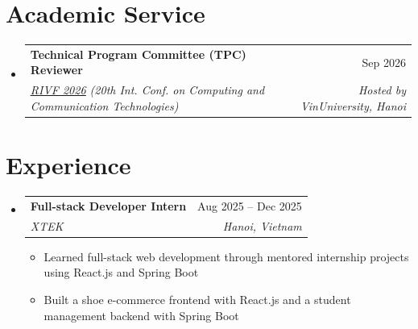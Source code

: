 \documentclass[letterpaper,11pt]{article}
\makeatletter
\newcommand{\resumeItem}[1]{\item\small{{#1 \vspace{-2pt}}}}
\newcommand{\resumeSubheading}[4]{
  \vspace{-2pt}\item
    \begin{tabular*}{0.97\textwidth}[t]{l@{\extracolsep{\fill}}r}
      \textbf{#1} & #2 \\
      \textit{\small#3} & \textit{\small #4} \\
    \end{tabular*}\vspace{-7pt}
}
\newcommand{\resumeSubHeadingListStart}{\begin{itemize}[leftmargin=0.15in, label={}]}
\newcommand{\resumeSubHeadingListEnd}{\end{itemize}}
\newcommand{\resumeItemListStart}{\begin{itemize}}
\newcommand{\resumeItemListEnd}{\end{itemize}\vspace{-5pt}}
\makeatother
\begin{document}
\section{Academic Service}
  \resumeSubHeadingListStart
    \resumeSubheading
      {Technical Program Committee (TPC) Reviewer}{Sep 2026}
      {\href{https://rivf2026.org/}{\underline{RIVF 2026}} (20th Int. Conf. on Computing and Communication Technologies)}{Hosted by VinUniversity, Hanoi}
  \resumeSubHeadingListEnd

\section{Experience}
  \resumeSubHeadingListStart
    \resumeSubheading
      {Full-stack Developer Intern}{Aug 2025 -- Dec 2025}
      {XTEK}{Hanoi, Vietnam}
      \resumeItemListStart
        \resumeItem{Learned full-stack web development through mentored internship projects using React.js and Spring Boot}
        \resumeItem{Built a shoe e-commerce frontend with React.js and a student management backend with Spring Boot}
      \resumeItemListEnd
  \resumeSubHeadingListEnd

\end{document}
